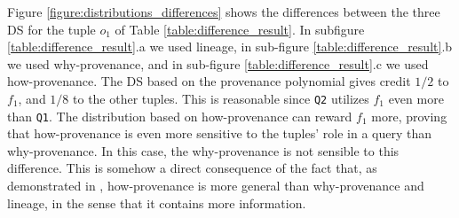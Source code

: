Figure \ref{figure:distributions_differences} shows the differences between the three DS for the tuple $o_1$ of Table \ref{table:difference_result}. In subfigure \ref{table:difference_result}.a we used lineage, in sub-figure \ref{table:difference_result}.b we used why-provenance, and in sub-figure \ref{table:difference_result}.c we used how-provenance. 
The DS based on the provenance polynomial gives credit $1/2$ to $f_1$, and $1/8$ to the other tuples.
This is reasonable since \texttt{Q2} utilizes $f_1$ even more than \texttt{Q1}. 
The distribution based on how-provenance can reward $f_1$ more, proving that how-provenance is even more sensitive to the tuples' role in a query than why-provenance. In this case, the why-provenance is not sensible to this difference. 
This is somehow a direct consequence of the fact that, as demonstrated in \citep{howProvenanceGreen}, how-provenance is more general than why-provenance and lineage, in the sense that it contains more information. 
